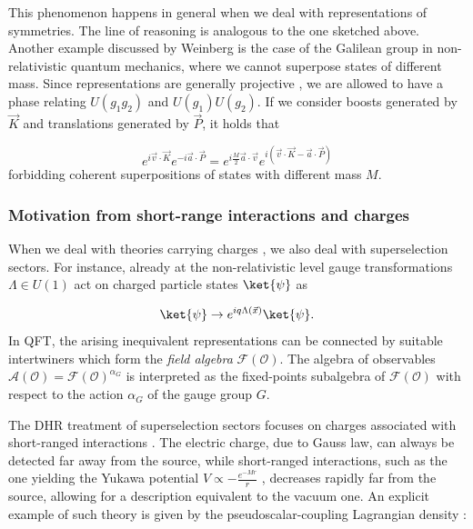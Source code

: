 \documentclass[a4paper,11pt]{article}
\begin{document}
This phenomenon happens in general when we deal with representations of symmetries. The line of reasoning is analogous to the one sketched above. Another example discussed by Weinberg \cite{Weinberg} is the case of the Galilean group in non-relativistic quantum mechanics, where we cannot superpose states of different mass. Since representations are generally projective \cite{Wigner}, we are allowed to have a phase relating $U(g_1 g_2)$ and $U(g_1)U(g_2)$. If we consider boosts generated by $\vec{K}$ and translations generated by $\vec{P}$, it holds that

\begin{equation}
    e^{i \vec{v} \cdot \vec{K}} e^{-i \vec{a} \cdot \vec{P}} = e^{i\frac{M}{2} \vec{a} \cdot \vec{v}} e^{i (\vec{v} \cdot \vec{K} - \vec{a} \cdot \vec{P})}
\end{equation}
%
forbidding coherent superpositions of states with different mass $M$.

\subsubsection{Motivation from short-range interactions and charges}

When we deal with theories carrying charges \cite{Aharonov} \cite{Strocchi}, we also deal with superselection sectors. For instance, already at the non-relativistic level gauge transformations $\Lambda \in U(1)$ act on charged particle states $\ket{\psi}$ as

\begin{equation}
    \ket{\psi} \rightarrow  e^{i q \Lambda(\vec{x})} \ket{\psi} \text{.}
\end{equation}
%
In QFT, the arising inequivalent representations can be connected by suitable intertwiners which form the \textit{field algebra} $\mathcal{F}(\mathcal{O})$. The algebra of observables $\mathcal{A}(\mathcal{O}) = \mathcal{F}(\mathcal{O})^{\alpha_G}$ is interpreted as the fixed-points subalgebra of $\mathcal{F}(\mathcal{O})$ with respect to the action $\alpha_G$ of the gauge group $G$.

The DHR treatment of superselection sectors focuses on charges associated with short-ranged interactions \cite{DHR}. The electric charge, due to Gauss law, can always be detected far away from the source, while short-ranged interactions, such as the one yielding the Yukawa potential $V \propto - \frac{e^{-Mr}}{r}$ \cite{Yukawa}, decreases rapidly far from the source, allowing for a description equivalent to the vacuum one. An explicit example of such theory is given by the pseudoscalar-coupling Lagrangian density \cite{Gell-Mann}:
\end{document}
